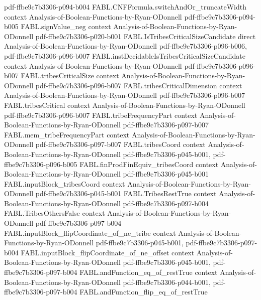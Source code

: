 \begin{theorem}
  {pdf-ffbe9c7b3306-p094-b004}
\proofstep
  {FABL.CNFFormula.switchAndOr_truncateWidth}
  {context}
  {Analysis-of-Boolean-Functions-by-Ryan-ODonnell}
  {pdf-ffbe9c7b3306-p094-b005}
\proofstep
  {FABL.signValue_neg}
  {context}
  {Analysis-of-Boolean-Functions-by-Ryan-ODonnell}
  {pdf-ffbe9c7b3306-p020-b001}
\proofstep
  {FABL.IsTribesCriticalSizeCandidate}
  {direct}
  {Analysis-of-Boolean-Functions-by-Ryan-ODonnell}
  {pdf-ffbe9c7b3306-p096-b006,
    pdf-ffbe9c7b3306-p096-b007}
\proofstep
  {FABL.instDecidableIsTribesCriticalSizeCandidate}
  {context}
  {Analysis-of-Boolean-Functions-by-Ryan-ODonnell}
  {pdf-ffbe9c7b3306-p096-b007}
\proofstep
  {FABL.tribesCriticalSize}
  {context}
  {Analysis-of-Boolean-Functions-by-Ryan-ODonnell}
  {pdf-ffbe9c7b3306-p096-b007}
\proofstep
  {FABL.tribesCriticalDimension}
  {context}
  {Analysis-of-Boolean-Functions-by-Ryan-ODonnell}
  {pdf-ffbe9c7b3306-p096-b007}
\proofstep
  {FABL.tribesCritical}
  {context}
  {Analysis-of-Boolean-Functions-by-Ryan-ODonnell}
  {pdf-ffbe9c7b3306-p096-b007}
\proofstep
  {FABL.tribeFrequencyPart}
  {context}
  {Analysis-of-Boolean-Functions-by-Ryan-ODonnell}
  {pdf-ffbe9c7b3306-p097-b007}
\proofstep
  {FABL.mem_tribeFrequencyPart}
  {context}
  {Analysis-of-Boolean-Functions-by-Ryan-ODonnell}
  {pdf-ffbe9c7b3306-p097-b007}
\proofstep
  {FABL.tribesCoord}
  {context}
  {Analysis-of-Boolean-Functions-by-Ryan-ODonnell}
  {pdf-ffbe9c7b3306-p045-b001,
    pdf-ffbe9c7b3306-p096-b005}
\proofstep
  {FABL.finProdFinEquiv_tribesCoord}
  {context}
  {Analysis-of-Boolean-Functions-by-Ryan-ODonnell}
  {pdf-ffbe9c7b3306-p045-b001}
\proofstep
  {FABL.inputBlock_tribesCoord}
  {context}
  {Analysis-of-Boolean-Functions-by-Ryan-ODonnell}
  {pdf-ffbe9c7b3306-p045-b001}
\proofstep
  {FABL.TribesRestTrue}
  {context}
  {Analysis-of-Boolean-Functions-by-Ryan-ODonnell}
  {pdf-ffbe9c7b3306-p097-b004}
\proofstep
  {FABL.TribesOthersFalse}
  {context}
  {Analysis-of-Boolean-Functions-by-Ryan-ODonnell}
  {pdf-ffbe9c7b3306-p097-b004}
\proofstep
  {FABL.inputBlock_flipCoordinate_of_ne_tribe}
  {context}
  {Analysis-of-Boolean-Functions-by-Ryan-ODonnell}
  {pdf-ffbe9c7b3306-p045-b001,
    pdf-ffbe9c7b3306-p097-b004}
\proofstep
  {FABL.inputBlock_flipCoordinate_of_ne_offset}
  {context}
  {Analysis-of-Boolean-Functions-by-Ryan-ODonnell}
  {pdf-ffbe9c7b3306-p045-b001,
    pdf-ffbe9c7b3306-p097-b004}
\proofstep
  {FABL.andFunction_eq_of_restTrue}
  {context}
  {Analysis-of-Boolean-Functions-by-Ryan-ODonnell}
  {pdf-ffbe9c7b3306-p044-b001,
    pdf-ffbe9c7b3306-p097-b004}
\proofstep
  {FABL.andFunction_flip_eq_of_restTrue}

\end{theorem}
